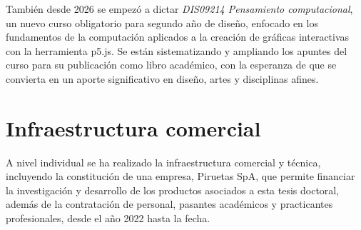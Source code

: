 \documentclass[../proyecto.tex]{subfiles}
\begin{document}
También desde 2026 se empezó a dictar \textit{DIS09214 Pensamiento computacional}, un nuevo curso obligatorio para segundo año de diseño, enfocado en los fundamentos de la computación aplicados a la creación de gráficas interactivas con la herramienta p5.js. Se están sistematizando y ampliando los apuntes del curso para su publicación como libro académico, con la esperanza de que se convierta en un aporte significativo en diseño, artes y disciplinas afines.

\section{Infraestructura comercial}

A nivel individual se ha realizado la infraestructura comercial y técnica, incluyendo la constitución de una empresa, Piruetas SpA, que permite financiar la investigación y desarrollo de los productos asociados a esta tesis doctoral, además de la contratación de personal, pasantes académicos y practicantes profesionales, desde el año 2022 hasta la fecha.
\end{document}
